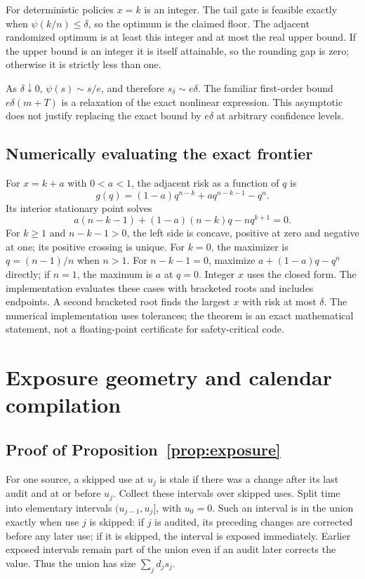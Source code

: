 For deterministic policies $x=k$ is an integer. The tail gate is feasible exactly when $\psi(k/n)\leq\delta$, so the optimum is the claimed floor. The adjacent randomized optimum is at least this integer and at most the real upper bound. If the upper bound is an integer it is itself attainable, so the rounding gap is zero; otherwise it is strictly less than one.

As $\delta\downarrow0$, $\psi(s)\sim s/e$, and therefore $s_\delta\sim e\delta$. The familiar first-order bound $e\delta(m+T)$ is a relaxation of the exact nonlinear expression. This asymptotic does not justify replacing the exact bound by $e\delta$ at arbitrary confidence levels.

\subsection{Numerically evaluating the exact frontier}
For $x=k+a$ with $0<a<1$, the adjacent risk as a function of $q$ is
\begin{equation}
 g(q)=(1-a)q^{n-k}+a q^{n-k-1}-q^n.
\end{equation}
Its interior stationary point solves
\begin{equation}
 a(n-k-1)+(1-a)(n-k)q-nq^{k+1}=0.\label{eq:derivative}
\end{equation}
For $k\geq1$ and $n-k-1>0$, the left side is concave, positive at zero and negative at one; its positive crossing is unique. For $k=0$, the maximizer is $q=(n-1)/n$ when $n>1$. For $n-k-1=0$, maximize $a+(1-a)q-q^n$ directly; if $n=1$, the maximum is $a$ at $q=0$. Integer $x$ uses the closed form. The implementation evaluates these cases with bracketed roots and includes endpoints. A second bracketed root finds the largest $x$ with risk at most $\delta$. The numerical implementation uses tolerances; the theorem is an exact mathematical statement, not a floating-point certificate for safety-critical code.

\section{Exposure geometry and calendar compilation}\label{app:exposure}
\subsection{Proof of Proposition~\ref{prop:exposure}}
For one source, a skipped use at $u_j$ is stale if there was a change after its last audit and at or before $u_j$. Collect these intervals over skipped uses. Split time into elementary intervals $(u_{j-1},u_j]$, with $u_0=0$. Such an interval is in the union exactly when use $j$ is skipped: if $j$ is audited, its preceding changes are corrected before any later use; if it is skipped, the interval is exposed immediately. Earlier exposed intervals remain part of the union even if an audit later corrects the value. Thus the union has size $\sum_j d_j s_j$.

